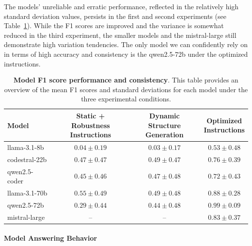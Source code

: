 \documentclass{DESSThesis}
\begin{document}
The models' unreliable and erratic performance, reflected in the relatively high standard deviation values, persists in the first and second experiments (see Table~\ref{tab:F1_and_st_deviation_second}). While the F1 scores are improved and the variance is somewhat reduced in the third experiment, the smaller models and the mistral-large still demonstrate high variation tendencies. The only model we can confidently rely on in terms of high accuracy and consistency is the qwen2.5-72b under the optimized instructions.

\begin{table}[h]
    \centering
    \renewcommand{\arraystretch}{1.2}
    \setlength{\tabcolsep}{10pt}
    \begin{tabular}{lccc}
        \hline
        \textbf{Model} & 
        \makecell{\textbf{Static + Robustness} \\ \textbf{Instructions}} & 
        \makecell{\textbf{Dynamic Structure} \\ \textbf{Generation}} & 
        \makecell{\textbf{Optimized} \\ \textbf{Instructions}} \\
        \hline
        llama-3.1-8b & \cellcolor{red!15} $0.04 \pm 0.19$ & \cellcolor{red!15} $0.03 \pm 0.17$ & \cellcolor{red!15} $0.53 \pm 0.48$ \\
        codestral-22b & $0.47 \pm 0.47$ & $0.49 \pm 0.47$ & $0.76 \pm 0.39$ \\
        qwen2.5-coder & $0.45 \pm 0.46$ & $0.47 \pm 0.48$ & $0.72 \pm 0.43$ \\
        llama-3.1-70b & $0.55 \pm 0.49$ & $0.49 \pm 0.48$ & $0.88 \pm 0.28$ \\
        qwen2.5-72b & $0.29 \pm 0.44$ & $0.44 \pm 0.48$ & \cellcolor{green!20} $0.99 \pm 0.09$ \\
        mistral-large & – & – & $0.83 \pm 0.37$ \\
        \hline
    \end{tabular}
    \caption[Model F1 score performance and consistency]{\textbf{Model F1 score performance and consistency}. This table provides an overview of the mean F1 scores and standard deviations for each model under the three experimental conditions.}
    \label{tab:F1_and_st_deviation_second}
\end{table}

\paragraph{Model Answering Behavior}\mbox{}\\
\end{document}
